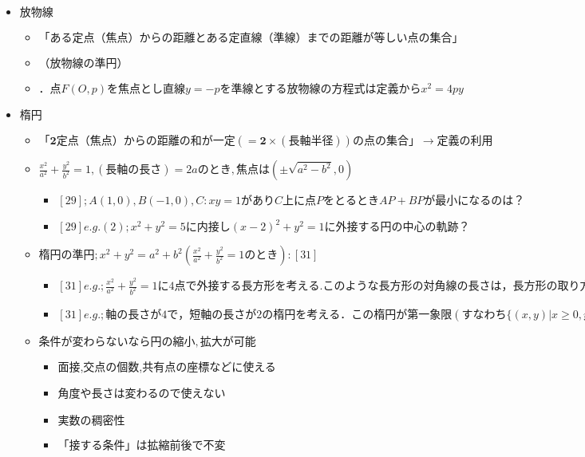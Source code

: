 \documentclass[dvipdfmx,uplatex]{jsarticle}
\begin{document}
\begin{itemize}
\begin{itemize}
	\end{itemize}
	\item $ 放物線$
	\begin{itemize}
		\item $ \bm{「ある定点（焦点）からの距離とある定直線（準線）までの距離が等しい点の集合」}$
		\item $ （放物線の準円）$
		\item $．点F(O,p)を焦点とし直線y=-pを準
		線とする放物線の方程式は定義からx^2=4py
		$
	\end{itemize}
	\item $ 楕円$
	\begin{itemize}
		\item $ \bm{「2定点（焦点）からの距離の和が一定(=2 \times (長軸半径) )の点の集合」} \rightarrow 定義の利用 $
		\item $ \frac{x^2}{a^2}+ \frac{y^2}{b^2}=1,(長軸の長さ)=2aのとき,焦点は( \pm \sqrt{a^2-b^2},0)$
		\begin{itemize}
			\item $ [29];A(1,0),B(-1,0),C:xy=1がありC上に点PをとるときAP+BPが最小になるのは？$
			\item $ [29]e.g.(2);x^2+y^2=5に内接し(x-2)^2+y^2=1に外接する円の中心の軌跡？$
		\end{itemize}
		\item $ 楕円の準円;x^2+y^2=a^2+b^2(\frac{x^2}{a^2}+ \frac{y^2}{b^2}=1のとき):[31]$
		\begin{itemize}
			\item $ [31]e.g.;\frac{x^2}{a^2}+ \frac{y^2}{b^2}=1に4点で外接する長方形を考える.この
			ような長方形の対角線の長さは，長方形の取り方によらず一定であ
			ることを証明しなさい． また対角線の長さをa,bを用いて表しなさ
			い$
			\item $ [31]e.g.;軸の長さが4で，短軸の長さが2の楕円を考える． この楕
			円が第一象限(すなわち \{(x,y)|x \geq 0,y \geq 0 \})においてx軸, y軸
			の両方に接しつつ可能なすべての位置にわたって動くとき， この楕
			円の中心の描く軌跡を求めよ．$
		\end{itemize}
		\item $ 条件が変わらないなら円の縮小,拡大が可能$
		\begin{itemize}
			\item 面接,交点の個数,共有点の座標などに使える
			\item 角度や長さは変わるので使えない
			\item $ 実数の稠密性$
			\item $ 「接する条件」は拡縮前後で不変$
			\begin{itemize}

\end{itemize}
\end{itemize}
\end{itemize}
\end{itemize}
\end{document}
